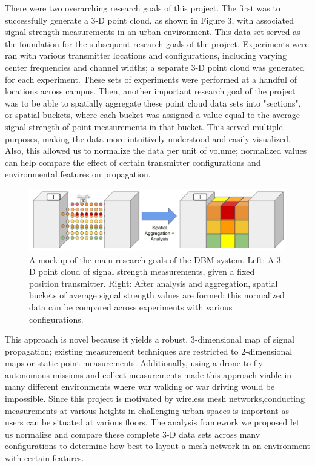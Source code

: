\documentclass[pageno]{jpaper}
\begin{document}
There were two overarching research goals of this project. The first was to successfully generate a 3-D point cloud, as shown in Figure 3, with associated signal strength measurements in an urban environment. This data set served as the foundation for the subsequent research goals of the project. Experiments were ran with various transmitter locations and configurations, including varying center frequencies and channel widths; a separate 3-D point cloud was generated for each experiment. These sets of experiments were performed at a handful of locations across campus. Then, another important research goal of the project was to be able to spatially aggregate these point cloud data sets into "sections", or spatial buckets, where each bucket was assigned a value equal to the average signal strength of point measurements in that bucket. This served multiple purposes, making the data more intuitively understood and easily visualized. Also, this allowed us to normalize the data per unit of volume; normalized values can help compare the effect of certain transmitter configurations and environmental features on propagation.

\begin{figure}[h]
	\caption[Main research goals: point cloud and aggregation]{A mockup of the main research goals of the DBM system. Left: A 3-D point cloud of signal strength measurements, given a fixed position transmitter. Right: After analysis and aggregation, spatial buckets of average signal strength values are formed; this normalized data can be compared across experiments with various configurations.}
	\includegraphics{measurement_goal}
	\centering
\end{figure}

This approach is novel because it yields a robust, 3-dimensional map of signal propagation; existing measurement techniques are restricted to 2-dimensional maps or static point measurements. Additionally, using a drone to fly autonomous missions and collect measurements made this approach viable in many different environments where war walking or war driving would be impossible. Since this project is motivated by wireless mesh networks,conducting measurements at various heights in challenging urban spaces is important as users can be situated at various floors. 
The analysis framework we proposed let us normalize and compare these complete 3-D data sets across many configurations to determine how best to layout a mesh network in an environment with certain features.
\end{document}
